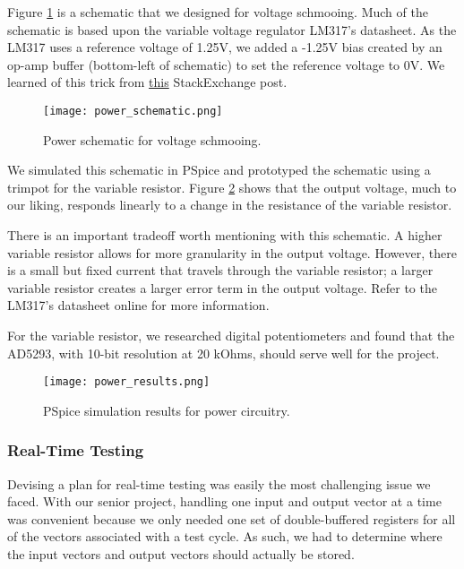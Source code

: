 Figure \ref{fig:power_schematic} is a schematic that we designed for voltage schmooing. Much of the schematic is based upon the variable voltage regulator LM317's datasheet. As the LM317 uses a reference voltage of 1.25V, we added a -1.25V bias created by an op-amp buffer (bottom-left of schematic) to set the reference voltage to 0V. We learned of this trick from  \href{http://electronics.stackexchange.com/questions/186760/why-do-linear-voltage-regulators-have-minimum-output-voltage-0-v}{this} StackExchange post. 

\begin{figure}[!h]
\texttt{[image: power\_schematic.png]}
\caption{Power schematic for voltage schmooing.}
\label{fig:power_schematic}
\end{figure}

We simulated this schematic in PSpice and prototyped the schematic using a trimpot for the variable resistor. Figure \ref{fig:power_results} shows that the output voltage, much to our liking, responds linearly to a change in the resistance of the variable resistor.

There is an important tradeoff worth mentioning with this schematic. A higher variable resistor allows for more granularity in the output voltage. However, there is a small but fixed current that travels through the variable resistor; a larger variable resistor creates a larger error term in the output voltage. Refer to the LM317's datasheet online for more information.

For the variable resistor, we researched digital potentiometers and found that the AD5293, with 10-bit resolution at 20 kOhms, should serve well for the project.

\begin{figure}
\texttt{[image: power\_results.png]}
\caption{PSpice simulation results for power circuitry.}
\label{fig:power_results}
\end{figure}

\subsubsection{Real-Time Testing}
Devising a plan for real-time testing was easily the most challenging issue we faced. With our senior project, handling one input and output vector at a time was convenient because we only needed one set of double-buffered registers for all of the vectors associated with a test cycle. As such, we had to determine where the input vectors and output vectors should actually be stored.

